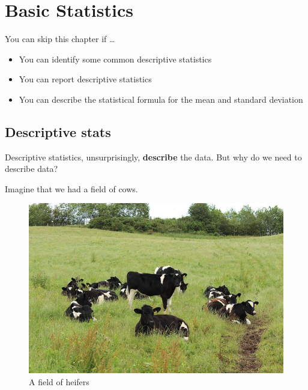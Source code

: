 \documentclass[
]{book}
\begin{document}
\hypertarget{statsbasic}{%
\chapter{Basic Statistics}\label{statsbasic}}

\begin{los}
You can skip this chapter if \ldots{}

\begin{itemize}
\item
  You can identify some common descriptive statistics
\item
  You can report descriptive statistics
\item
  You can describe the statistical formula for the mean and standard
  deviation
\end{itemize}
\end{los}

\hypertarget{descstats}{%
\section{Descriptive stats}\label{descstats}}

Descriptive statistics, unsurprisingly, \textbf{describe} the data. But why do we need to describe data?

Imagine that we had a field of cows.

\begin{figure}

{\centering \includegraphics[width=8.88in]{images/09_statbasic/cows_1} 

}

\caption{A field of heifers}\label{fig:unnamed-chunk-143}
\end{figure}
\end{document}
